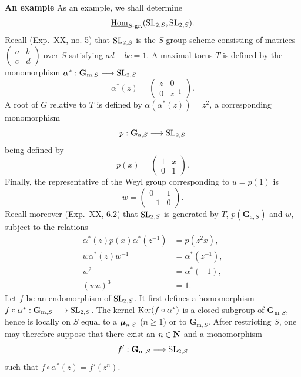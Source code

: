 \label{XXIV.7.4}\textbf{An example}
As an example, we shall determine
\[
\underline{\operatorname{Hom}}_{S\text{-gr.}}(\operatorname{SL}_{2,S},\operatorname{SL}_{2,S}).
\]
\label{XXIV.7.4.1}
Recall (Exp.~XX, no. 5) that $\operatorname{SL}_{2,S}$ is the $S$-group scheme consisting of matrices $\left(\begin{smallmatrix}a&b\\c&d\end{smallmatrix}\right)$ over $S$ satisfying $ad-bc=1$. A maximal torus $T$ is defined by the monomorphism $\alpha^*:\mathbf G_{\mathrm m,S}\longrightarrow\operatorname{SL}_{2,S}$
\[
\alpha^*(z)=\begin{pmatrix}z&0\\0&z^{-1}\end{pmatrix}.
\]
A root of $G$ relative to $T$ is defined by $\alpha(\alpha^*(z))=z^2$, a corresponding monomorphism
\[
p:\mathbf G_{\mathrm a,S}\longrightarrow\operatorname{SL}_{2,S}
\]
being defined by
\[
p(x)=\begin{pmatrix}1&x\\0&1\end{pmatrix}.
\]
Finally, the representative of the Weyl group corresponding to $u=p(1)$ is
\[
w=\begin{pmatrix}0&1\\-1&0\end{pmatrix}.
\]
Recall moreover (Exp.~XX, 6.2) that $\operatorname{SL}_{2,S}$ is generated by $T$, $p(\mathbf G_{\mathrm a,S})$ and $w$, subject to the relations
\[
\begin{aligned}
\alpha^*(z)p(x)\alpha^*(z^{-1})&=p(z^2x),\\
w\alpha^*(z)w^{-1}&=\alpha^*(z^{-1}),\\
w^2&=\alpha^*(-1),\\
(wu)^3&=1.
\end{aligned}
\]
\label{XXIV.7.4.2}
Let $f$ be an endomorphism of $\operatorname{SL}_{2,S}$. It first defines a homomorphism $f\circ\alpha^*:\mathbf G_{\mathrm m,S}\longrightarrow\operatorname{SL}_{2,S}$. The kernel $\operatorname{Ker}(f\circ\alpha^*)$ is a closed subgroup of $\mathbf G_{\mathrm m,S}$, hence is locally on $S$ equal to a $\boldsymbol{\mu}_{n,S}$ ($n\geq1$) or to $\mathbf G_{\mathrm m,S}$. After restricting $S$, one may therefore suppose that there exist an $n\in\mathbf{N}$ and a monomorphism
\[
f':\mathbf G_{\mathrm m,S}\longrightarrow\operatorname{SL}_{2,S}
\]
such that $f\circ\alpha^*(z)=f'(z^n)$.

